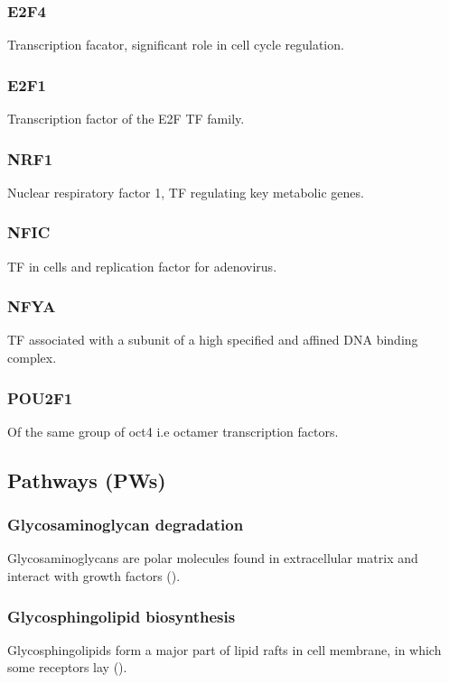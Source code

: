 \documentclass[3p,authoryear,preprint,12pt]{elsarticle}
\begin{document}
\subsubsection{E2F4}Transcription facator, significant role in cell cycle regulation. 

\subsubsection{E2F1}Transcription factor of the E2F TF family.

\subsubsection{NRF1}Nuclear respiratory factor 1, TF regulating key metabolic genes.

\subsubsection{NFIC}TF in cells and replication factor for adenovirus. 

\subsubsection{NFYA}TF associated with a subunit of a high specified and affined DNA binding complex.

\subsubsection{POU2F1}Of the same group of oct4 i.e octamer transcription factors.

\subsection{Pathways (PWs)}

\subsubsection{Glycosaminoglycan degradation}
Glycosaminoglycans are polar molecules found in extracellular matrix and interact with growth factors (\cite{doi:10.3109/10409239509083490}).

\subsubsection{Glycosphingolipid biosynthesis}
Glycosphingolipids form a major part of lipid rafts in cell membrane, in which some receptors lay (\cite{Glycosphingolipids}).
\end{document}
